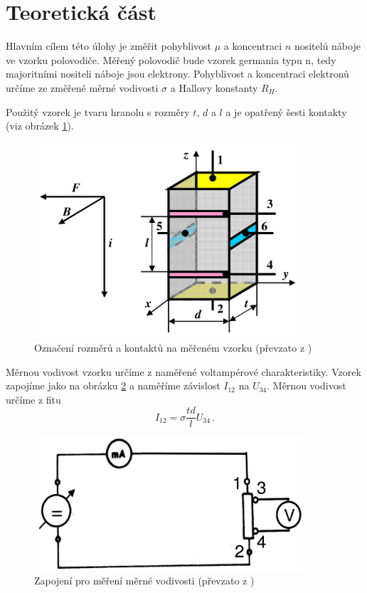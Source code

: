 \section*{Teoretická část}

Hlavním cílem této úlohy je změřit pohyblivost $\mu$ a koncentraci $n$ nositelů náboje ve vzorku polovodiče.
Měřený polovodič bude vzorek germania typu n, tedy majoritními nositeli náboje jsou elektrony.
Pohyblivost a koncentraci elektronů určíme ze změřené měrné vodivosti $\sigma$ a Hallovy konstanty $R_H$.

Použitý vzorek je tvaru hranolu s rozměry $t$, $d$ a $l$ a je opatřený šesti kontakty (viz obrázek \ref{obr:vzorek}).

\begin{figure}[htbp]
\centering
\includegraphics[width=100mm,scale=0.5]{graficos/vzorek}
\caption{Označení rozměrů a kontaktů na měřeném vzorku (převzato z \cite{skripta})}
\label{obr:vzorek}
\end{figure}

Měrnou vodivost vzorku určíme z naměřené voltampérové charakteristiky.
Vzorek zapojíme jako na obrázku \ref{obr:schemaodpor} a naměříme závislost $I_{12}$ na $U_{34}$.
Měrnou vodivost určíme z fitu
\begin{equation}
I_{12}=\sigma \frac{td}{l} U_{34} \,.
\end{equation}

\begin{figure}[htbp]
\centering
\includegraphics[width=100mm, scale=0.5]{graficos/schema}
\caption{Zapojení pro měření měrné vodivosti (převzato z \cite{skripta})}
\label{obr:schemaodpor}
\end{figure}

